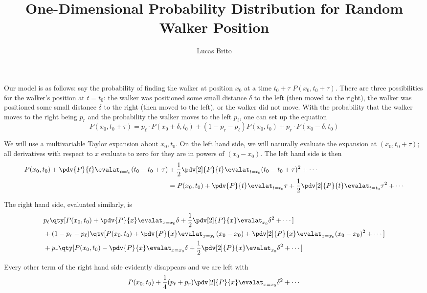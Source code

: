 \documentclass{article}
\title{One-Dimensional Probability Distribution for Random Walker Position}
\author{Lucas Brito}
\begin{document}
\maketitle

Our model is as follows: say the probability of finding the walker at position
$ x_0 $ at a time $ t_0 +\tau $ $ P(x_0, t_0 +\tau) $. There are three possibilities 
for the walker's position at $ t = t_0 $: the walker was positioned some small 
distance $ \delta $ to the left (then moved to the right), the walker was 
positioned some small distance $ \delta $ to the right (then moved to the left), 
or the walker did not move. With the probability that the walker moves to the 
right being $ p_r $ and the probability the walker moves to the left $ p_\ell $, 
one can set up the equation 
\begin{equation*}
	P(x_0, t_0 + \tau) = p_\ell \cdot P(x_0 + \delta, t_0)
	 + (1-p_r - p_\ell)P(x_0, t_0) + p_r \cdot P(x_0 - \delta, t_0) 
\end{equation*}

We will use a multivariable Taylor expansion about $ x_0, t_0 $. On the left 
hand side, we will naturally evaluate the expansion at $( x_0, t_0+\tau) $; 
all derivatives with respect to $ x $ evaluate to zero for they are in powers 
of $ (x_0 - x_0) $. The left hand side is then 
\begin{align*}
	P(x_0, t_0) + \pdv{P}{t}\evalat_{t=t_0}^{} (t_0 - t_0 + \tau) 
	&+ \frac{1}{2}\pdv[2]{P}{t}\evalat_{t=t_0}^{} (t_0 - t_0 + \tau)^2 + \cdots \\
	&= 
	P(x_0, t_0) + \pdv{P}{t}\evalat_{t=t_0}^{} \tau 
	+ \frac{1}{2}\pdv[2]{P}{t}\evalat_{t=t_0}^{} \tau^2 + \cdots
\end{align*}

The right hand side, evaluated similarly, is 
\begin{align*}
	&p_\ell \qty[ P(x_0, t_0) + \pdv{P}{x}\evalat_{x=x_0}^{} \delta 
		+ \frac{1}{2}\pdv[2]{P}{x} \evalat_{x_0}^{}\delta^2 + \cdots ] \\
	& + (1-p_r - p_\ell)
	\qty[ P(x_0, t_0) + \pdv{P}{x}\evalat_{x=x_0}^{} (x_0-x_0)+
	\pdv[2]{P}{x}\evalat_{x=x_0}^{} (x_0- x_0)^2 + \cdots  ]\\
	& + p_r \qty[ P(x_0, t_0) - \pdv{P}{x}\evalat_{x=x_0}^{} \delta 
		+ \frac{1}{2}\pdv[2]{P}{x} \evalat_{x_0}^{}\delta^2 + \cdots ] 
\end{align*}

Every other term of the right hand side evidently disappears and we are 
left with 
\begin{equation*}
	P(x_0,t_0) + \frac{1}{4}(p_\ell + p_r)
	\pdv[2]{P}{x}\evalat_{x=x_0}^{}\delta^2 + \cdots 
\end{equation*}
\end{document}
